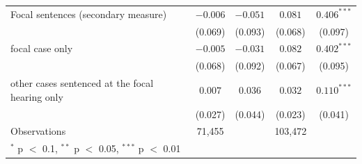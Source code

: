 \begin{tabular}{lcccc}
Focal sentences (secondary measure) & $-0.006$ & $-0.051$ & $0.081$ & $0.406^{***}$ \\
 & (0.069) & (0.093) & (0.068) & (0.097) \\
\quad focal case only & $-0.005$ & $-0.031$ & $0.082$ & $0.402^{***}$ \\
 & (0.068) & (0.092) & (0.067) & (0.095) \\
\quad other cases sentenced at the focal hearing only & $0.007$ & $0.036$ & $0.032$ & $0.110^{***}$ \\
 & (0.027) & (0.044) & (0.023) & (0.041) \\
Observations & 71,455 &  & 103,472 &  \\
\bottomrule
\multicolumn{5}{l}{\footnotesize $^{*}$ p $<$ 0.1, $^{**}$ p $<$ 0.05, $^{***}$ p $<$ 0.01} \\
\end{tabular}
